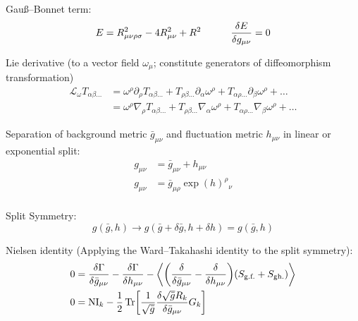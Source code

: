 		\noindent
		Gauß--Bonnet term:
		\begin{equation}
			E = R_{\mu\nu\rho\sigma}^2 - 4 R_{\mu\nu}^2 + R^2
			\hsp \fdv{E}{g_{\mu\nu}} = 0
		\end{equation}

		\noindent
		Lie derivative (\wrt to a vector field $\omega_\mu$; constitute generators of diffeomorphism transformation)
		\begin{equation}
			\begin{aligned}
				\mathcal{L}_\omega T_{\alpha\beta\dots} 
				&= \omega^\rho \partial_\rho T_{\alpha\beta\dots} + T_{\rho\beta\dots} \partial_\alpha \omega^\rho + T_{\alpha\rho\dots} \partial_\beta \omega^\rho + \dots \\
				&= \omega^\rho \nabla_\rho T_{\alpha\beta\dots} + T_{\rho\beta\dots} \nabla_\alpha \omega^\rho + T_{\alpha\rho\dots} \nabla_\beta \omega^\rho + \dots
			\end{aligned}
		\end{equation}

		\noindent
		Separation of background metric $\bar{g}_{\mu\nu}$ and fluctuation metric $h_{\mu\nu}$ in linear or exponential split:
		\begin{align}
			g_{\mu\nu} &= \bar{g}_{\mu\nu} + h_{\mu\nu} \\
			g_{\mu\nu} &= \bar{g}_{\mu\rho}\exp(h)^\rho{}_{\nu} \\
		\end{align}

		\noindent
		Split Symmetry:
		\begin{equation}
			g(\bar{g},h) \to g(\bar{g}+\delta \bar{g}, h + \delta h) = g(\bar{g},h)
		\end{equation}

		\noindent
		Nielsen identity (Applying the Ward--Takahashi identity to the split symmetry):
		\begin{align}
			0 &= \fdv{\Gamma}{\bar{g}_{\mu\nu}} - \fdv{\Gamma}{h_{\mu\nu}} - \Avg{\qty(\fdv{\bar{g}_{\mu\nu}} - \fdv{h_{\mu\nu}})(S_\text{g.f.} + S_\text{gh.})} \\
			0 &= \mathrm{NI}_k - \frac{1}{2} \tr[\frac{1}{\sqrt{\bar{g}}} \fdv{\sqrt{\bar{g}}R_k}{\bar{g}_{\mu\nu}}G_k]
		\end{align}
